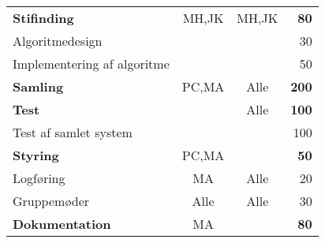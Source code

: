 \begin{center}
\begin{tabular}{l c c r}
	\hspace*{0.3cm} \textbf{Stifinding}							& MH,JK	& MH,JK	& \textbf{80}\\
	\hspace*{0.3cm}\hspace*{0.3cm} Algoritmedesign				&		&		& 30\\
	\hspace*{0.3cm}\hspace*{0.3cm} Implementering af algoritme	&		&		& 50\\
	\hspace*{0.3cm} \textbf{Samling}							& PC,MA	& Alle	& \textbf{200}\\
	\hspace*{0.3cm} \textbf{Test}								& 		& Alle	& \textbf{100}\\
	\hspace*{0.3cm}\hspace*{0.3cm} Test af samlet system		&		&		& 100\\
	\hline
	\textbf{Styring}											& PC,MA	& 		& \textbf{50}\\
	\hspace*{0.3cm} Logføring									& MA	& Alle	& 20\\
	\hspace*{0.3cm} Gruppemøder									& Alle	& Alle	& 30\\
	\hline
	\textbf{Dokumentation}										& MA	&		& \textbf{80}
\end{tabular}
\end{center}